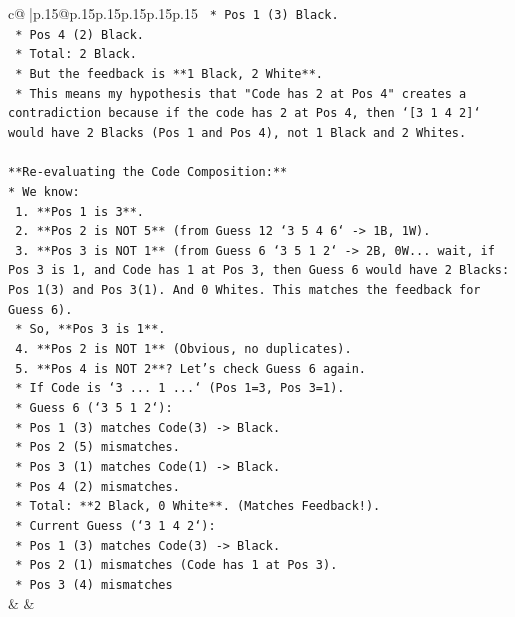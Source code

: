 \documentclass{article}
\begin{document}
{\begin{supertabular}{c@{$\;$}|p{.15\linewidth}@{}p{.15\linewidth}p{.15\linewidth}p{.15\linewidth}p{.15\linewidth}p{.15\linewidth}}
{{{\texttt{        *   Pos 1 (3) Black.} \\
\texttt{        *   Pos 4 (2) Black.} \\
\texttt{        *   Total: 2 Black.} \\
\texttt{        *   But the feedback is **1 Black, 2 White**.} \\
\texttt{        *   This means my hypothesis that "Code has 2 at Pos 4" creates a contradiction because if the code has 2 at Pos 4, then `{[}3 1 4 2{]}` would have 2 Blacks (Pos 1 and Pos 4), not 1 Black and 2 Whites.} \\
\\ 
\texttt{**Re{-}evaluating the Code Composition:**} \\
\texttt{*   We know:} \\
\texttt{    1.  **Pos 1 is 3**.} \\
\texttt{    2.  **Pos 2 is NOT 5** (from Guess 12 `3 5 4 6` {-}> 1B, 1W).} \\
\texttt{    3.  **Pos 3 is NOT 1** (from Guess 6 `3 5 1 2` {-}> 2B, 0W... wait, if Pos 3 is 1, and Code has 1 at Pos 3, then Guess 6 would have 2 Blacks: Pos 1(3) and Pos 3(1). And 0 Whites. This matches the feedback for Guess 6).} \\
\texttt{        *   So, **Pos 3 is 1**.} \\
\texttt{    4.  **Pos 2 is NOT 1** (Obvious, no duplicates).} \\
\texttt{    5.  **Pos 4 is NOT 2**? Let's check Guess 6 again.} \\
\texttt{        *   If Code is `3 ... 1 ...` (Pos 1=3, Pos 3=1).} \\
\texttt{        *   Guess 6 (`3 5 1 2`):} \\
\texttt{            *   Pos 1 (3) matches Code(3) {-}> Black.} \\
\texttt{            *   Pos 2 (5) mismatches.} \\
\texttt{            *   Pos 3 (1) matches Code(1) {-}> Black.} \\
\texttt{            *   Pos 4 (2) mismatches.} \\
\texttt{            *   Total: **2 Black, 0 White**. (Matches Feedback!).} \\
\texttt{        *   Current Guess (`3 1 4 2`):} \\
\texttt{            *   Pos 1 (3) matches Code(3) {-}> Black.} \\
\texttt{            *   Pos 2 (1) mismatches (Code has 1 at Pos 3).} \\
\texttt{            *   Pos 3 (4) mismatches} \\
            }
        }
    }
    & & \\ \\


\end{supertabular}}
\end{document}
